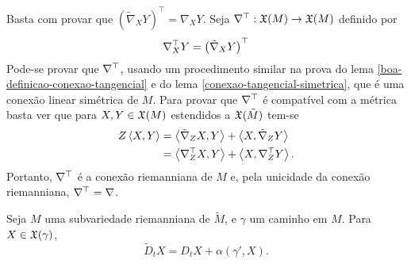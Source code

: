 \begin{demonstracao}
	Basta com provar que $\left(\tilde{\nabla}_X Y\right)^\top = \nabla_X Y$. 
	Seja $\nabla^\top: \mathfrak{X}(M) \rightarrow \mathfrak{X}(M)$ definido por
	\begin{equation*}
		\nabla^\top_X Y = \left(\tilde{\nabla}_X Y\right)^\top	
	\end{equation*}
	Pode-se provar que $\nabla^\top$, usando um procedimento similar na prova do lema \ref{boa-definicao-conexao-tangencial} e do lema \ref{conexao-tangencial-simetrica}, que é uma conexão linear simétrica de $M$. Para provar que $\nabla^\top$ é compatível com a métrica basta ver que para $X,Y \in \mathfrak{X}(M)$ estendidos a $\mathfrak{X}(\tilde{M})$ tem-se
	\begin{align*}
		Z \left\langle X,Y \right\rangle &= \left\langle \tilde{\nabla}_Z X,Y \right\rangle + \left\langle X,\tilde{\nabla}_Z Y \right\rangle\\
		&= \left\langle \nabla^\top_Z X,Y \right\rangle + \left\langle X,\nabla^\top_Z Y \right\rangle.
	\end{align*}
	Portanto, $\nabla^\top$ é a conexão riemanniana de $M$ e, pela unicidade da conexão riemanniana, $\nabla^\top = \nabla$.
\end{demonstracao}

\begin{proposicao}\label{formula-de-gauss-para-caminhos}
	Seja $M$ uma subvariedade riemanniana de $\tilde{M}$, e $\gamma$ um caminho em $M$. Para $X \in \mathfrak{X}(\gamma)$,
	\begin{equation*}
	\tilde{D}_t X = D_t X + \alpha(\gamma', X).
	\end{equation*}
\end{proposicao}

